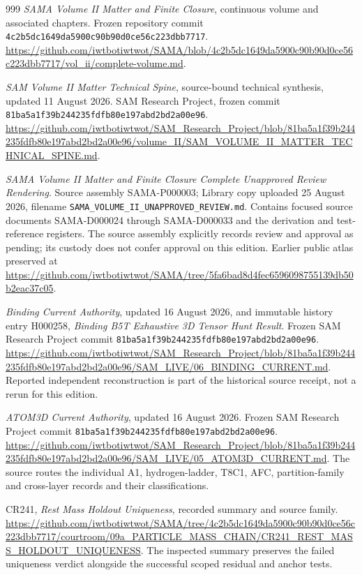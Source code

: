 \begin{thebibliography}{999}
\emph{SAMA Volume II Matter and Finite Closure}, continuous volume and associated chapters.
Frozen repository commit \nolinkurl{4c2b5dc1649da5900c90b90d0ce56c223dbb7717}.
\url{https://github.com/iwtbotiwtwot/SAMA/blob/4c2b5dc1649da5900c90b90d0ce56c223dbb7717/vol_ii/complete-volume.md}.

\emph{SAM Volume II Matter Technical Spine}, source-bound technical synthesis, updated 11 August 2026.
SAM Research Project, frozen commit \nolinkurl{81ba5a1f39b244235fdfb80e197abd2bd2a00e96}.
\url{https://github.com/iwtbotiwtwot/SAM_Research_Project/blob/81ba5a1f39b244235fdfb80e197abd2bd2a00e96/volume_II/SAM_VOLUME_II_MATTER_TECHNICAL_SPINE.md}.

\emph{SAMA Volume II Matter and Finite Closure Complete Unapproved Review Rendering}.
Source assembly SAMA-P000003; Library copy uploaded 25 August 2026, filename \texttt{SAMA\_VOLUME\_II\_UNAPPROVED\_REVIEW.md}.
Contains focused source documents SAMA-D000024 through SAMA-D000033 and the derivation and test-reference registers.
The source assembly explicitly records review and approval as pending; its custody does not confer approval on this edition.
Earlier public atlas preserved at
\url{https://github.com/iwtbotiwtwot/SAMA/tree/5fa6bad8d4fec6596098755139db50b2eac37c05}.

\emph{Binding Current Authority}, updated 16 August 2026, and immutable history entry H000258, \emph{Binding B5T Exhaustive 3D Tensor Hunt Result}.
Frozen SAM Research Project commit \nolinkurl{81ba5a1f39b244235fdfb80e197abd2bd2a00e96}.
\url{https://github.com/iwtbotiwtwot/SAM_Research_Project/blob/81ba5a1f39b244235fdfb80e197abd2bd2a00e96/SAM_LIVE/06_BINDING_CURRENT.md}.
Reported independent reconstruction is part of the historical source receipt, not a rerun for this edition.

\emph{ATOM3D Current Authority}, updated 16 August 2026.
Frozen SAM Research Project commit \nolinkurl{81ba5a1f39b244235fdfb80e197abd2bd2a00e96}.
\url{https://github.com/iwtbotiwtwot/SAM_Research_Project/blob/81ba5a1f39b244235fdfb80e197abd2bd2a00e96/SAM_LIVE/05_ATOM3D_CURRENT.md}.
The source routes the individual A1, hydrogen-ladder, T8C1, AFC, partition-family and cross-layer records and their classifications.

CR241, \emph{Rest Mass Holdout Uniqueness}, recorded summary and source family.
\url{https://github.com/iwtbotiwtwot/SAMA/tree/4c2b5dc1649da5900c90b90d0ce56c223dbb7717/courtroom/09a_PARTICLE_MASS_CHAIN/CR241_REST_MASS_HOLDOUT_UNIQUENESS}.
The inspected summary preserves the failed uniqueness verdict alongside the successful scoped residual and anchor tests.


\end{thebibliography}
